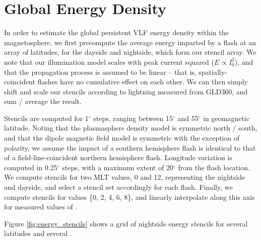 \section{Global Energy Density}
In order to estimate the global persistent VLF energy density within the magnetosphere, we first precompute the average energy imparted by a flash at an array of latitudes, for the dayside and nightside, which form our stencil array. We note that our illumination model scales with peak current squared ($E \propto I_0^2$), and that the propagation process is assumed to be linear -- that is, spatially-coincident flashes have no cumulative effect on each other. We can then simply shift and scale our stencils according to lightning measured from GLD360, and sum / average the result. 

Stencils are computed for 1$^\circ$ steps, ranging between 15$^\circ$ and 55$^\circ$ in geomagnetic latitude. Noting that the plasmasphere density model is symmetric north / south, and that the dipole magnetic field model is symmetric with the exception of polarity, we assume the impact of a southern hemisphere flash is identical to that of a field-line-coincident northern hemisphere flash. Longitude variation is computed in 0.25$^\circ$ steps, with a maximum extent of 20$^\circ$ from the flash location. We compute stencils for two MLT values, 0 and 12, representing the nightside and dayside, and select a stencil set accordingly for each flash. Finally, we compute stencils for \kp{} values \{0, 2, 4, 6, 8\}, and linearly interpolate along this axis for measured values of \kp{}.

Figure \ref{fig:energy_stencils} shows a grid of nightside energy stencils for several latitudes and several \kp{}.

